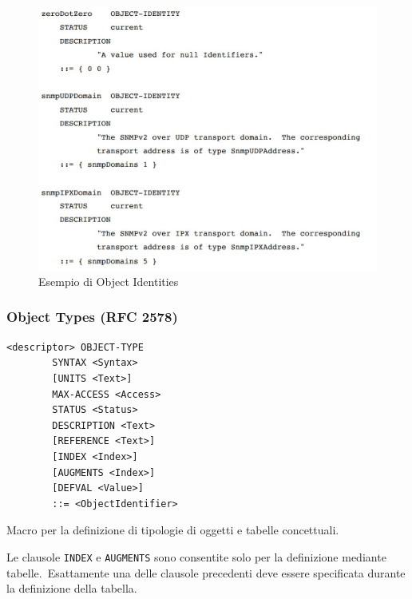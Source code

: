 \begin{figure}[H]
    \centering
    \includegraphics[width=\textwidth]{immagini/ObjectIdentities.jpg}
    \caption*{Esempio di Object Identities}
    \label{fig:my_label}
\end{figure}

\subsubsection{Object Types (RFC 2578)}

\begin{verbatim}
<descriptor> OBJECT-TYPE
        SYNTAX <Syntax>
        [UNITS <Text>]
        MAX-ACCESS <Access>
        STATUS <Status>
        DESCRIPTION <Text>
        [REFERENCE <Text>]
        [INDEX <Index>]
        [AUGMENTS <Index>]
        [DEFVAL <Value>]
        ::= <ObjectIdentifier>
\end{verbatim}
Macro per la definizione di tipologie di oggetti e tabelle concettuali.

Le clausole \texttt{INDEX} e \texttt{AUGMENTS} sono consentite solo per la definizione mediante tabelle.\
Esattamente una delle clausole precedenti deve essere specificata durante la definizione della tabella.

